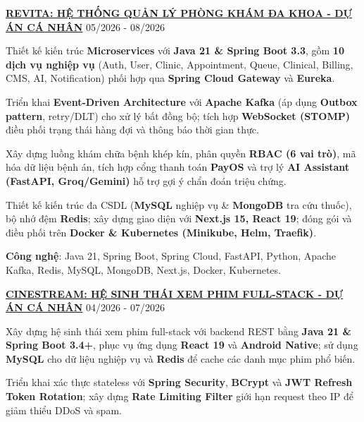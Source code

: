 \Needspace{0.45\textheight}
\begin{cventries} %

    \cvsimpleentry
    {\href{https://github.com/daoductam/revita-microservice}{\textbf{REVITA: HỆ THỐNG QUẢN LÝ PHÒNG KHÁM ĐA KHOA - DỰ ÁN CÁ NHÂN}}} %
    {05/2026 - 08/2026} %
    {
      \begin{cvitems} %
        \item {Thiết kế kiến trúc \textbf{Microservices} với \textbf{Java 21 \& Spring Boot 3.3}, gồm \textbf{10 dịch vụ nghiệp vụ} (Auth, User, Clinic, Appointment, Queue, Clinical, Billing, CMS, AI, Notification) phối hợp qua \textbf{Spring Cloud Gateway} và \textbf{Eureka}.}
        \item {Triển khai \textbf{Event-Driven Architecture} với \textbf{Apache Kafka} (áp dụng \textbf{Outbox pattern}, retry/DLT) cho xử lý bất đồng bộ; tích hợp \textbf{WebSocket (STOMP)} điều phối trạng thái hàng đợi và thông báo thời gian thực.}
        \item {Xây dựng luồng khám chữa bệnh khép kín, phân quyền \textbf{RBAC (6 vai trò)}, mã hóa dữ liệu bệnh án, tích hợp cổng thanh toán \textbf{PayOS} và trợ lý \textbf{AI Assistant (FastAPI, Groq/Gemini)} hỗ trợ gợi ý chẩn đoán triệu chứng.}
        \item {Thiết kế kiến trúc đa CSDL (\textbf{MySQL} nghiệp vụ \& \textbf{MongoDB} tra cứu thuốc), bộ nhớ đệm \textbf{Redis}; xây dựng giao diện với \textbf{Next.js 15, React 19}; đóng gói và điều phối trên \textbf{Docker \& Kubernetes (Minikube, Helm, Traefik)}.}
        \item {\textbf{Công nghệ}: Java 21, Spring Boot, Spring Cloud, FastAPI, Python, Apache Kafka, Redis, MySQL, MongoDB, Next.js, Docker, Kubernetes.}
      \end{cvitems}
    }
  \cvsimpleentry
    {\href{https://github.com/daoductam/web-film-vibe}{\textbf{CINESTREAM: HỆ SINH THÁI XEM PHIM FULL-STACK - DỰ ÁN CÁ NHÂN}}} %
    {04/2026 - 07/2026} %
    {
      \begin{cvitems} %
        \item {Xây dựng hệ sinh thái xem phim full-stack với backend REST bằng \textbf{Java 21 \& Spring Boot 3.4+}, phục vụ ứng dụng \textbf{React 19} và \textbf{Android Native}; sử dụng \textbf{MySQL} cho dữ liệu nghiệp vụ và \textbf{Redis} để cache các danh mục phim phổ biến.}
        \item {Triển khai xác thực stateless với \textbf{Spring Security}, \textbf{BCrypt} và \textbf{JWT Refresh Token Rotation}; xây dựng \textbf{Rate Limiting Filter} giới hạn request theo IP để giảm thiểu DDoS và spam.}

\end{cvitems}}
\end{cventries}
